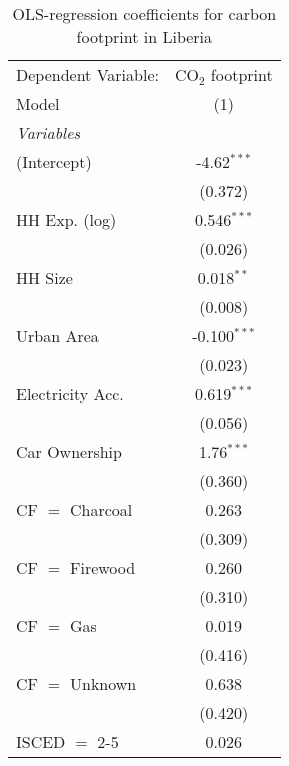 
\begin{table}[htbp!]
   \centering
   \small
   \begin{adjustbox}{width = 1\textwidth, max height = 0.95\textheight, center}
      \begin{threeparttable}[b]
         \caption{\label{tab:OLS_2_LBR} OLS-regression coefficients for carbon footprint in Liberia}
         \begin{tabular}{lc}
            \tabularnewline \midrule \midrule
            Dependent Variable: & CO$_{2}$ footprint\\  
            Model               & (1)\\  
            \midrule
            \emph{Variables}\\
            (Intercept)         & -4.62$^{***}$\\   
                                & (0.372)\\   
            HH Exp. (log)       & 0.546$^{***}$\\   
                                & (0.026)\\   
            HH Size             & 0.018$^{**}$\\   
                                & (0.008)\\   
            Urban Area          & -0.100$^{***}$\\   
                                & (0.023)\\   
            Electricity Acc.    & 0.619$^{***}$\\   
                                & (0.056)\\   
            Car Ownership       & 1.76$^{***}$\\   
                                & (0.360)\\   
            CF $=$ Charcoal     & 0.263\\   
                                & (0.309)\\   
            CF $=$ Firewood     & 0.260\\   
                                & (0.310)\\   
            CF $=$ Gas          & 0.019\\   
                                & (0.416)\\   
            CF $=$ Unknown      & 0.638\\   
                                & (0.420)\\   
            ISCED $=$ 2-5       & 0.026\\   

\end{tabular}
\end{threeparttable}
\end{adjustbox}
\end{table}
